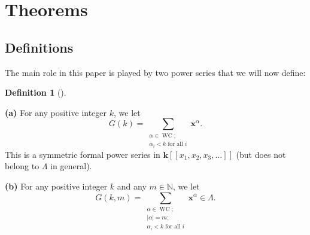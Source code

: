 \documentclass[numbers=enddot,12pt,final,onecolumn,notitlepage]{scrartcl}%
\theoremstyle{definition}
\newtheorem{defi}[theo]{Definition}
\newenvironment{definition}[1][]
{\begin{defi}[#1]\begin{leftbar}}
{\end{leftbar}\end{defi}}
\let\sumnonlimits\sum
\renewcommand{\sum}{\sumnonlimits\limits}
\begin{document}
\section{\label{sect.thms}Theorems}

\subsection{\label{subsect.petk.def}Definitions}

The main role in this paper is played by two power series that we will now define:

\begin{definition}
\label{def.G}\textbf{(a)} For any positive integer $k$, we let\footnotemark%
\begin{equation}
G\left(  k\right)  =\sum_{\substack{\alpha\in\operatorname*{WC};\\\alpha
_{i}<k\text{ for all }i}}\mathbf{x}^{\alpha}. \label{eq.Gk=}%
\end{equation}
This is a symmetric formal power series in $\mathbf{k}\left[  \left[
x_{1},x_{2},x_{3},\ldots\right]  \right]  $ (but does not belong to $\Lambda$
in general).

\textbf{(b)} For any positive integer $k$ and any $m\in\mathbb{N}$, we let%
\begin{equation}
G\left(  k,m\right)  =\sum_{\substack{\alpha\in\operatorname*{WC};\\\left\vert
\alpha\right\vert =m;\\\alpha_{i}<k\text{ for all }i}}\mathbf{x}^{\alpha}%
\in\Lambda. \label{eq.Gkm=}%
\end{equation}

\end{definition}

\end{document}
